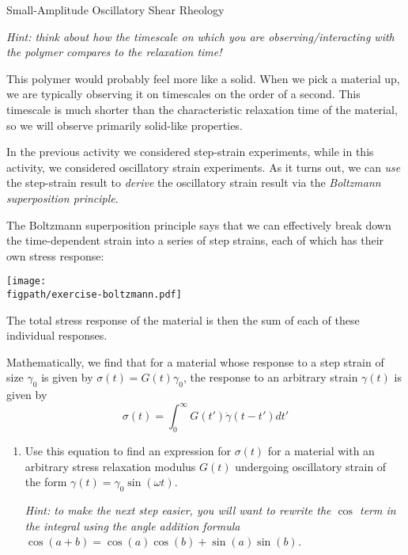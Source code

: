 \begin{activity}[extension]{Small-Amplitude Oscillatory Shear Rheology}
\begin{exercises}
\begin{enumerate}
			\emph{Hint: think about how the timescale on which you are observing/interacting with the polymer compares to the relaxation time!}
	
					\begin{solution}{}
					
						This polymer would probably feel more like a solid.  When we pick a material up, we are typically observing it on timescales on the order of a second.  This timescale is much shorter than the characteristic relaxation time of the material, so we will observe primarily solid-like properties.
					
					\end{solution}
					
		\end{enumerate}

		\exercise \label{\labelbase:exc:Boltzmann} In the previous activity we considered step-strain experiments, while in this activity, we considered oscillatory strain experiments.  As it turns out, we can \emph{use} the step-strain result to \emph{derive} the oscillatory strain result via the \emph{Boltzmann superposition principle}.
		
			The Boltzmann superposition principle says that we can effectively break down the time-dependent strain into a series of step strains, each of which has their own stress response:
				
		\centerline{\texttt{[image: \\figpath/exercise-boltzmann.pdf]}}
			
			The total stress response of the material is then the sum of each of these individual responses.
			
			Mathematically, we find that for a material whose response to a step strain of size $\gamma_0$ is given by $\sigma(t) = G(t)\gamma_0$, the response to an arbitrary strain $\gamma(t)$ is given by
			\begin{equation*}
				\sigma(t) = \int_0^{\infty} G(t') \dot\gamma(t-t') dt'
			\end{equation*}
		
			\begin{enumerate}
			
				\item Use this equation to find an expression for $\sigma(t)$ for a material with an arbitrary stress relaxation modulus $G(t)$ undergoing oscillatory strain of the form $\gamma(t) = \gamma_0 \sin(\omega t)$.
				
					\emph{Hint: to make the next step easier, you will want to rewrite the $\cos$ term in the integral using the angle addition formula $\cos(a+b) = \cos(a)\cos(b) + \sin(a)\sin(b)$.}
				

\end{enumerate}
\end{exercises}
\end{activity}

